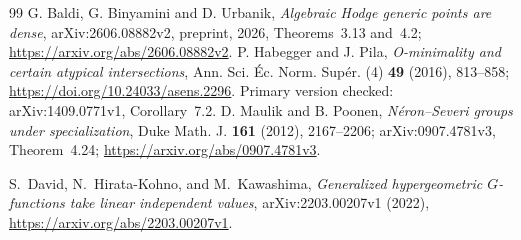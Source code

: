 \begin{thebibliography}{99}
G. Baldi, G. Binyamini and D. Urbanik,
\emph{Algebraic Hodge generic points are dense},
arXiv:2606.08882v2, preprint, 2026, Theorems~3.13 and~4.2;
\url{https://arxiv.org/abs/2606.08882v2}.
P. Habegger and J. Pila,
\emph{O-minimality and certain atypical intersections},
Ann. Sci. \'Ec. Norm. Sup\'er. (4) \textbf{49} (2016), 813--858;
\url{https://doi.org/10.24033/asens.2296}.
Primary version checked: arXiv:1409.0771v1, Corollary~7.2.
D. Maulik and B. Poonen,
\emph{N\'eron--Severi groups under specialization},
Duke Math. J. \textbf{161} (2012), 2167--2206;
arXiv:0907.4781v3, Theorem~4.24;
\url{https://arxiv.org/abs/0907.4781v3}.

S.~David, N.~Hirata-Kohno, and M.~Kawashima,
\emph{Generalized hypergeometric $G$-functions take linear independent values},
arXiv:2203.00207v1 (2022),
\url{https://arxiv.org/abs/2203.00207v1}.

\end{thebibliography}
